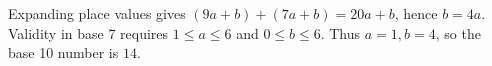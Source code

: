 Expanding place values gives $(9a+b)+(7a+b)=20a+b$, hence $b=4a$. Validity in base 7 requires $1\le a\le6$ and $0\le b\le6$. Thus $a=1,b=4$, so the base 10 number is $\boxed{14}$.
